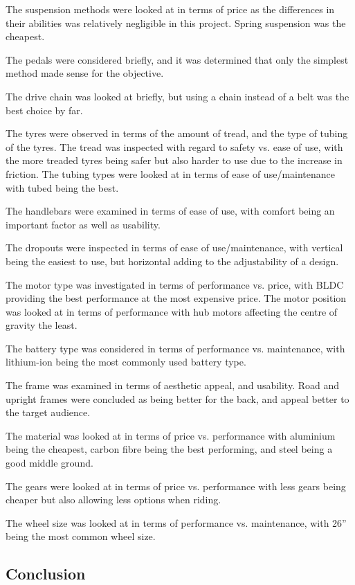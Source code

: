 \documentclass[a4paper,11pt]{article}
\begin{document}
The suspension methods were looked at in terms of price as the differences in their abilities was relatively negligible in this project. Spring suspension was the cheapest.

The pedals were considered briefly, and it was determined that only the simplest method made sense for the objective.

The drive chain was looked at briefly, but using a chain instead of a belt was the best choice by far.

The tyres were observed in terms of the amount of tread, and the type of tubing of the tyres. The tread was inspected with regard to safety vs. ease of use, with the more treaded tyres being safer but also harder to use due to the increase in friction. The tubing types were looked at in terms of ease of use/maintenance with tubed being the best.

The handlebars were examined in terms of ease of use, with comfort being an important factor as well as usability.

The dropouts were inspected in terms of ease of use/maintenance, with vertical being the easiest to use, but horizontal adding to the adjustability of a design.

The motor type was investigated in terms of performance vs. price, with BLDC providing the best performance at the most expensive price. The motor position was looked at in terms of performance with hub motors affecting the centre of gravity the least.

The battery type was considered in terms of performance vs. maintenance, with lithium-ion being the most commonly used battery type. 

The frame was examined in terms of aesthetic appeal, and usability. Road and upright frames were concluded as being better for the back, and appeal better to the target audience.

The material was looked at in terms of price vs. performance with aluminium being the cheapest, carbon fibre being the best performing, and steel being a good middle ground.

The gears were looked at in terms of price vs. performance with less gears being cheaper but also allowing less options when riding.

The wheel size was looked at in terms of performance vs. maintenance, with 26'' being the most common wheel size. 

\subsection{Conclusion}
\end{document}
